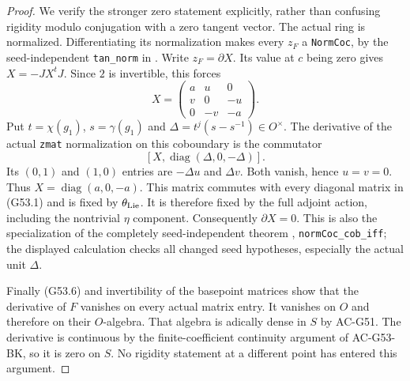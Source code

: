 \begin{proof}
We verify the stronger zero statement explicitly,
rather than confusing rigidity modulo conjugation
with a zero tangent vector.
The actual ring is normalized.  Differentiating its
normalization makes every $z_F$ a
\texttt{NormCoc}, by the seed-independent
\texttt{tan\_norm} in
.
Write $z_F=\partial X$.
Its value at $c$ being zero gives
$X=-JX^tJ$.  Since $2$ is invertible, this forces
\[
 X=\begin{pmatrix}a&u&0\\v&0&-u\\0&-v&-a\end{pmatrix}.
                                                               \tag{G53.9}
\]
Put $t=\chi(g_1)$, $s=\gamma(g_1)$ and
$\Delta=t^j(s-s^{-1})\in O^\times$.
The derivative of the actual \texttt{zmat}
normalization on this coboundary is the commutator
\[
          [X,\operatorname{diag}(\Delta,0,-\Delta)].
                                                               \tag{G53.10}
\]
Its $(0,1)$ and $(1,0)$ entries are $-\Delta u$ and
$\Delta v$.  Both vanish, hence $u=v=0$.
Thus $X=\operatorname{diag}(a,0,-a)$.
This matrix commutes with every diagonal matrix in
(G53.1) and is fixed by $\theta_{\rm Lie}$.
It is therefore fixed by the full adjoint action,
including the nontrivial $\eta$ component.
Consequently $\partial X=0$.
This is also the specialization of the completely
seed-independent theorem
,
\texttt{normCoc\_cob\_iff}; the displayed calculation
checks all changed seed hypotheses, especially the
actual unit $\Delta$.

Finally (G53.6) and invertibility of the basepoint
matrices show that the derivative of $F$ vanishes on
every actual matrix entry.  It vanishes on $O$ and
therefore on their $O$-algebra.  That algebra is
adically dense in $S$ by AC-G51.
The derivative is continuous by the finite-coefficient
continuity argument of AC-G53-BK, so it is zero on
$S$.  No rigidity statement at a different point
has entered this argument.
\end{proof}

